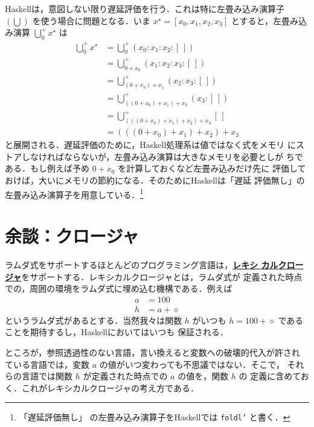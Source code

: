 \documentclass[a5paper,twoside,fleqn]{jsbook}
\newcommand{\programminglanguage}[1]{\textsf{#1}}
\newcommand{\haskell}{\programminglanguage{Haskell}}
\newcommand{\keyword}[1]{{\underline{\textbf{#1}}}}
\newcommand{\code}[1]{\texttt{#1}}
\newcommand{\mEmptyList}{{[\,]}}
\newcommand{\mAnonParam}{\diamond}
\DeclareMathOperator*{\mFold}{\bigcup}
\newcommand{\mListWith}[1]{\left[#1\right]}
\newcommand{\mList}[1]{{#1}^\mathrm{\star}}
\begin{document}
\haskell は，意図しない限り遅延評価を行う．これは特に左畳み込み演算子
$(\mFold)$ を使う場合に問題となる．いま
$\mList{x}=\mListWith{x_0,x_1,x_2,x_3}$ とすると，左畳み込み演算
$\mFold^+_0\mList{x}$ は
\begin{align}
  \mFold^+_0\mList{x}&=\mFold^+_0{}(x_0:x_1:x_2:\mEmptyList)\\
  &=\mFold^+_{0+x_0}{}(x_1:x_2:x_3:\mEmptyList)\\
  &=\mFold^+_{(0+x_0)+x_1}{}(x_2:x_3:\mEmptyList)\\
  &=\mFold^+_{((0+x_0)+x_1)+x_2}{}(x_3:\mEmptyList)\\
  &=\mFold^+_{(((0+x_0)+x_1)+x_2)+x_3}{}\mEmptyList\\
  &=(((0+x_0)+x_1)+x_2)+x_3
\end{align}
と展開される．遅延評価のために，\haskell 処理系は値ではなく式をメモリ
にストアしなければならないが，左畳み込み演算は大きなメモリを必要としが
ちである．もし例えば予め $0+x_0$ を計算しておくなど左畳み込みだけ先に
評価しておけば，大いにメモリの節約になる．そのために\haskell は「遅延
  評価無し」の左畳み込み演算子を用意している．\footnote{「遅延評価無し」
  の左畳み込み演算子を\haskell では \code{foldl'} と書く．}


%

\section{余談：クロージャ}

ラムダ式をサポートするほとんどのプログラミング言語は，\keyword{レキシ
  カルクロージャ}をサポートする．レキシカルクロージャとは，ラムダ式が
定義された時点での，周囲の環境をラムダ式に埋め込む機構である．例えば
\begin{align}
a&=100\\ h&=a+\mAnonParam
\end{align}
というラムダ式があるとする．当然我々は関数 $h$ がいつも
$h=100+\mAnonParam$ であることを期待するし，\haskell においてはいつも
保証される．

ところが，参照透過性のない言語，言い換えると変数への破壊的代入が許され
ている言語では，変数 $a$ の値がいつ変わっても不思議ではない．そこで，
それらの言語では関数 $h$ が定義された時点での $a$ の値を，関数 $h$ の
定義に含めておく．これがレキシカルクロージャの考え方である．
\end{document}
